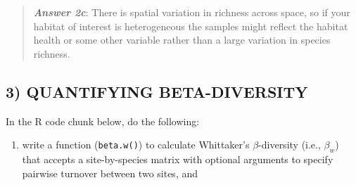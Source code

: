 \documentclass[
]{article}
\providecommand{\tightlist}{%
  \setlength{\itemsep}{0pt}\setlength{\parskip}{0pt}}
\begin{document}
\begin{quote}
\textbf{\emph{Answer 2c}}: There is spatial variation in richness across
space, so if your habitat of interest is heterogeneous the samples might
reflect the habitat health or some other variable rather than a large
variation in species richness.
\end{quote}

\hypertarget{quantifying-beta-diversity}{%
\subsection{3) QUANTIFYING
BETA-DIVERSITY}\label{quantifying-beta-diversity}}

In the R code chunk below, do the following:

\begin{enumerate}
\def\labelenumi{\arabic{enumi}.}
\tightlist
\item
  write a function (\texttt{beta.w()}) to calculate Whittaker's
  \(\beta\)-diversity (i.e., \(\beta_{w}\)) that accepts a
  site-by-species matrix with optional arguments to specify pairwise
  turnover between two sites, and
\end{enumerate}
\end{document}
